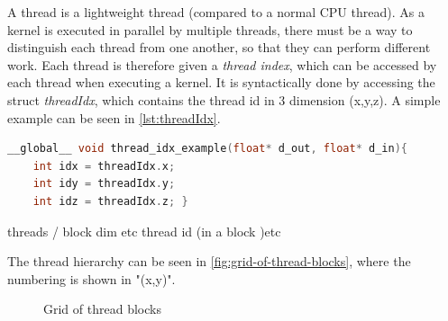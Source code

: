 A \cuda{} thread is a lightweight thread (compared to a normal CPU thread).
As a kernel is executed in parallel by multiple threads, there must be a way to distinguish each thread from one another, so that they can perform different work.
Each thread is therefore given a \textit{thread index}, which can be accessed by each thread when executing a kernel.
It is syntactically done by accessing the struct \textit{threadIdx}, which contains the thread id in 3 dimension (x,y,z).
A simple example can be seen in \autoref{lst:threadIdx}.
\begin{lstlisting}[language=C,caption={Thread index example},label=lst:threadIdx]
__global__ void thread_idx_example(float* d_out, float* d_in){
	int idx = threadIdx.x;
	int idy = threadIdx.y;
	int idz = threadIdx.z; }
\end{lstlisting}


threads / block dim etc
thread id (in a block )etc

The thread hierarchy can be seen in \autoref{fig:grid-of-thread-blocks}, where the numbering is shown in "(x,y)".
\begin{figure}[ht]
	\centering
	\caption{Grid of thread blocks}
	\label{fig:grid-of-thread-blocks}
\end{figure}